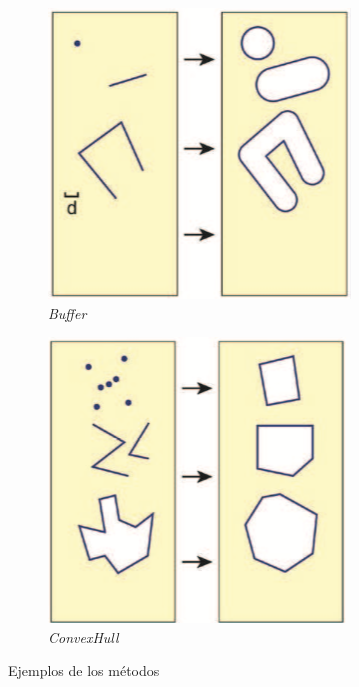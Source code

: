 \begin{figure}[H]
	\centering
	\begin{subfigure}[h]{0.38\textwidth} 
		\includegraphics[width=\textwidth]{imagenes/capitulo4/buffer}
		\caption{\textit{Buffer}}
	\end{subfigure}       
	\begin{subfigure}[h]{0.38\textwidth} 
		\includegraphics[width=\textwidth]{imagenes/capitulo4/convexHull}
		\caption{\textit{ConvexHull}}
	\end{subfigure}
	\caption{Ejemplos de los métodos \cite{AsignaturaSIG}}
	\label{fig:ejemplos-metodos}
\end{figure}



